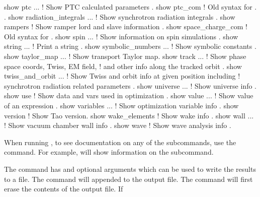 {{{{{{{{\begin{example}
  show ptc ...                 ! Show PTC calculated parameters .
  show ptc_com                 ! Old syntax for . .
  show radiation_integrals ... ! Show synchrotron radiation integrals .
  show rampers                 ! Show ramper lord and slave information .
  show space_charge_com        ! Old syntax for  .
  show spin ...                ! Show information on spin simulations .
  show string ...              ! Print a string .
  show symbolic_numbers ...    ! Show symbolic constants .
  show taylor_map ...          ! Show transport Taylor map.
  show track ...               ! Show phase space coords, Twiss, EM field, 
                               !   and other info along the tracked orbit .
  show twiss_and_orbit ...     ! Show Twiss and orbit info at given position including
                               !   synchrotron radiation related parameters .
  show universe ...            ! Show universe info .
  show use                     ! Show data and vars used in optimization .
  show value ...               ! Show value of an expression .
  show variables ...           ! Show optimization variable info .
  show version                 ! Show Tao version.
  show wake_elements           ! Show wake info .
  show wall ...                ! Show vacuum chamber wall info .
  show wave                    ! Show wave analysis info .
\end{example}

\vskip 10pt 

When running \tao, to see documentation on any of the subcommands, use the  command. For example,  will show information on the  subcommand.

The  command has  and  optional arguments which can be used to write
the results to a file.  The  command will appended to the output file. The  command will first erase the contents of the output file. If \vn{global%
\vn{*} character in it, a three digit number is substituted for the \vn{*}. The value of the number
starts at \vn{001} and increases by 1 each time \vn{show -write} is used.  Example:
\begin{example}
  show -write floor.dat lat -floor  ! Write floor positions to the file "floor.dat".
\end{example}

}}}}}}}}}
